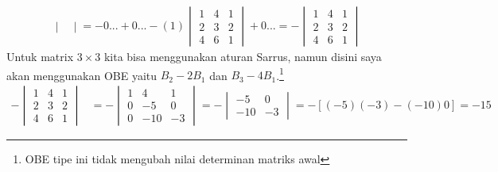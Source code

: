 \documentclass[10pt,openany,a4paper]{article}
\begin{document}
\begin{enumerate}
\begin{itemize}
\begin{align*}
\begin{vmatrix}
                        \end{vmatrix}=-0...+0...-(1)\begin{vmatrix}
                                                        1 & 4 & 1 \\
                                                        2 & 3 & 2 \\
                                                        4 & 6 & 1
                                                    \end{vmatrix}+0...=-\begin{vmatrix}
                                                                            1 & 4 & 1 \\
                                                                            2 & 3 & 2 \\
                                                                            4 & 6 & 1
                                                                        \end{vmatrix}
                    \end{align*}
                    Untuk matrix $3\times 3$ kita bisa menggunakan aturan Sarrus, namun disini saya akan menggunakan OBE yaitu $B_2-2B_1$ dan $B_3-4B_1$.\footnote{OBE tipe ini tidak mengubah nilai determinan matriks awal}
                    \begin{align*}
                        -\begin{vmatrix}
                             1 & 4 & 1 \\
                             2 & 3 & 2 \\
                             4 & 6 & 1
                         \end{vmatrix} & =-\begin{vmatrix}
                                               1 & 4   & 1  \\
                                               0 & -5  & 0  \\
                                               0 & -10 & -3
                                           \end{vmatrix}=-\begin{vmatrix}
                                                              -5  & 0  \\
                                                              -10 & -3
                                                          \end{vmatrix}=-[(-5)(-3)-(-10)0]=-15

\end{align*}
\end{itemize}
\end{enumerate}
\end{document}
